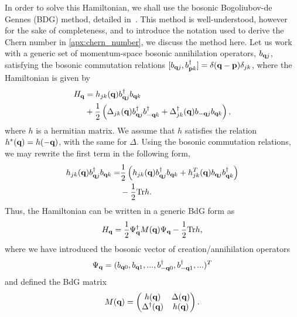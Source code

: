 In order to solve this Hamiltonian, we shall use the bosonic Bogoliubov-de Gennes (BDG) method, detailed in~\cite{blaizot_quantum_1986}. This method is well-understood, however for the sake of completeness, and to introduce the notation used to derive the Chern number in \textsection\ref{apx:chern_number}, we discuss the method here. Let us work with a generic set of momentum-space bosonic annihilation operators, $b_{\textbf q j}$, satisfying the bosonic commutation relations $[b_{\textbf q j}, b_{\textbf p k}^\dag] = \delta(\textbf q - \textbf p) \delta_{jk}$, where the Hamiltonian is given by
\begin{align} 
    \begin{split}
        H_{\textbf q} & = 
        h_{jk}(\textbf q) b_{\textbf q j}^\dag b_{\textbf q k}  \\ 
        & + \frac{1}{2}\left ( \Delta_{jk} (\textbf q) b_{\textbf q j}^\dag b_{-\textbf q k}^\dag
        + \Delta_{jk}^\dag (\textbf q) b_{-\textbf q j} b_{\textbf q k}
        \right ), 
    \end{split}
\end{align}
where $h$ is a hermitian matrix. We assume that $h$ satisfies the relation $h^*(\textbf q) = h(-\textbf q)$, with the same for $\Delta$. Using the bosonic commutation relations, we may rewrite the first term in the following form,
\begin{align}
\begin{split}
    h_{jk}(\textbf q) b_{\textbf q j}^\dag b_{\textbf q k}  =
    & \frac{1}{2} \left ( 
    h_{jk}(\textbf q) b_{\textbf q j}^\dag b_{\textbf q k} + 
    h_{jk}^T(\textbf q)  b_{\textbf q j} b_{\textbf q k}^\dag
    \right ) \\ 
    & - \frac{1}{2} \textup{Tr} h.
\end{split}
\end{align}
Thus, the Hamiltonian can be written in a generic BdG form as 
\begin{align}
    H_{\textbf q} =
    \frac{1}{2}
    \Psi_{\textbf q}^\dag
    M(\textbf q)
    \Psi_{\textbf q}
    - \frac{1}{2} \textup{Tr} h,
\end{align}
where we have introduced the bosonic vector of creation/annihilation operators
\begin{align}
    \Psi_{\textbf q} = (b_{\textbf q 0},b_{\textbf q 1},...,b^\dag_{-\textbf q 0},b^\dag_{-\textbf q 1},...  )^T
\end{align}
and defined the BdG matrix
\begin{align}\label{eqn:m_definition}
    M(\textbf q) = 
    \begin{pmatrix}
        h(\textbf q) & \Delta  ( \textbf q) \\
        \Delta^\dag(\textbf q) & h (\textbf q)
    \end{pmatrix}.
\end{align}

